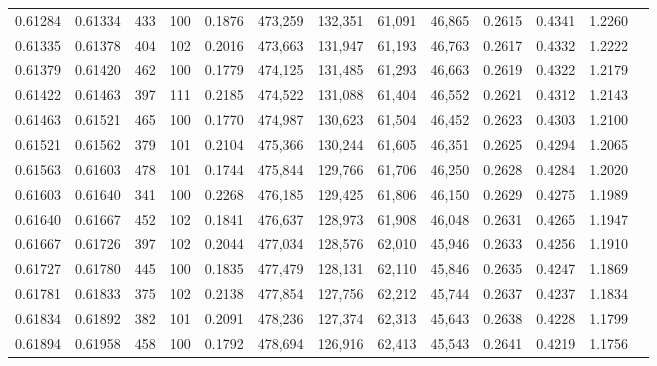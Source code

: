 \begin{tabular}{rrrrrrrrrrrrr}
0.61284 & 0.61334 &   433 & 100 &                                     0.1876 & 473,259 & 132,351 &  61,091 &  46,865 & 0.2615 & 0.4341 & 1.2260 \\
0.61335 & 0.61378 &   404 & 102 &                                     0.2016 & 473,663 & 131,947 &  61,193 &  46,763 & 0.2617 & 0.4332 & 1.2222 \\
0.61379 & 0.61420 &   462 & 100 &                                     0.1779 & 474,125 & 131,485 &  61,293 &  46,663 & 0.2619 & 0.4322 & 1.2179 \\
0.61422 & 0.61463 &   397 & 111 &                                     0.2185 & 474,522 & 131,088 &  61,404 &  46,552 & 0.2621 & 0.4312 & 1.2143 \\
0.61463 & 0.61521 &   465 & 100 &                                     0.1770 & 474,987 & 130,623 &  61,504 &  46,452 & 0.2623 & 0.4303 & 1.2100 \\
0.61521 & 0.61562 &   379 & 101 &                                     0.2104 & 475,366 & 130,244 &  61,605 &  46,351 & 0.2625 & 0.4294 & 1.2065 \\
0.61563 & 0.61603 &   478 & 101 &                                     0.1744 & 475,844 & 129,766 &  61,706 &  46,250 & 0.2628 & 0.4284 & 1.2020 \\
0.61603 & 0.61640 &   341 & 100 &                                     0.2268 & 476,185 & 129,425 &  61,806 &  46,150 & 0.2629 & 0.4275 & 1.1989 \\
0.61640 & 0.61667 &   452 & 102 &                                     0.1841 & 476,637 & 128,973 &  61,908 &  46,048 & 0.2631 & 0.4265 & 1.1947 \\
0.61667 & 0.61726 &   397 & 102 &                                     0.2044 & 477,034 & 128,576 &  62,010 &  45,946 & 0.2633 & 0.4256 & 1.1910 \\
0.61727 & 0.61780 &   445 & 100 &                                     0.1835 & 477,479 & 128,131 &  62,110 &  45,846 & 0.2635 & 0.4247 & 1.1869 \\
0.61781 & 0.61833 &   375 & 102 &                                     0.2138 & 477,854 & 127,756 &  62,212 &  45,744 & 0.2637 & 0.4237 & 1.1834 \\
0.61834 & 0.61892 &   382 & 101 &                                     0.2091 & 478,236 & 127,374 &  62,313 &  45,643 & 0.2638 & 0.4228 & 1.1799 \\
0.61894 & 0.61958 &   458 & 100 &                                     0.1792 & 478,694 & 126,916 &  62,413 &  45,543 & 0.2641 & 0.4219 & 1.1756 \\

\end{tabular}
